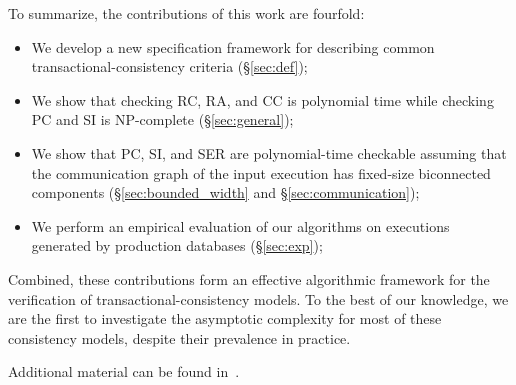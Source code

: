 To summarize, the contributions of this work are fourfold:
\begin{itemize}

  \item We develop a new specification framework for describing common transactional-consistency criteria (§\ref{sec:def});

  \item We show that checking RC, RA, and CC is polynomial time while checking PC and SI is NP-complete (§\ref{sec:general});

  \item We show that PC, SI, and SER are polynomial-time checkable assuming that the communication graph of the input execution has fixed-size biconnected components (§\ref{sec:bounded_width} and §\ref{sec:communication});
  
  \item We perform an empirical evaluation of our algorithms on executions generated by production databases (§\ref{sec:exp});

\end{itemize}
Combined, these contributions form an effective algorithmic framework for the verification of transactional-consistency models. To the best of our knowledge, we are the first to investigate the asymptotic complexity for most of these consistency models, despite their prevalence in practice.

Additional material can be found in~\cite{DBLP:journals/corr/abs-1908-04509}. 










